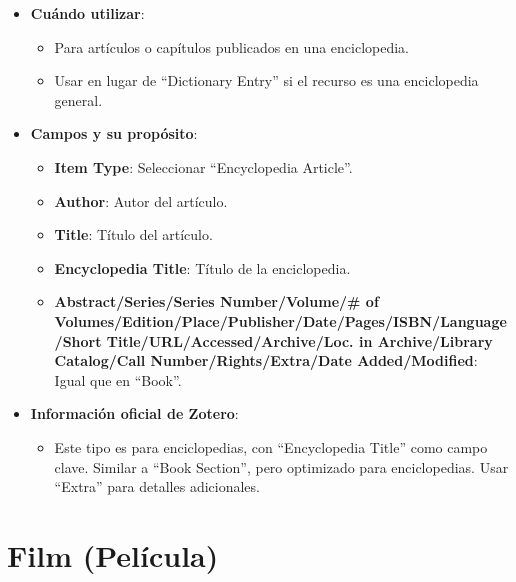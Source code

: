 \documentclass[
  jou,
  floatsintext,
  longtable,
  a4paper,
  nolmodern,
  notxfonts,
  notimes,
  12pt,
  colorlinks=true,linkcolor=blue,citecolor=blue,urlcolor=blue]{apa7}
\providecommand{\tightlist}{%
  \setlength{\itemsep}{0pt}\setlength{\parskip}{0pt}}
\begin{document}
\begin{itemize}
\tightlist
\item
  \textbf{Cuándo utilizar}:

  \begin{itemize}
  \tightlist
  \item
    Para artículos o capítulos publicados en una enciclopedia.
  \item
    Usar en lugar de ``Dictionary Entry'' si el recurso es una
    enciclopedia general.
  \end{itemize}
\item
  \textbf{Campos y su propósito}:

  \begin{itemize}
  \tightlist
  \item
    \textbf{Item Type}: Seleccionar ``Encyclopedia Article''.
  \item
    \textbf{Author}: Autor del artículo.
  \item
    \textbf{Title}: Título del artículo.
  \item
    \textbf{Encyclopedia Title}: Título de la enciclopedia.
  \item
    \textbf{Abstract/Series/Series Number/Volume/\# of
    Volumes/Edition/Place/Publisher/Date/Pages/ISBN/Language/Short
    Title/URL/Accessed/Archive/Loc. in Archive/Library Catalog/Call
    Number/Rights/Extra/Date Added/Modified}: Igual que en ``Book''.
  \end{itemize}
\item
  \textbf{Información oficial de Zotero}:

  \begin{itemize}
  \tightlist
  \item
    Este tipo es para enciclopedias, con ``Encyclopedia Title'' como
    campo clave. Similar a ``Book Section'', pero optimizado para
    enciclopedias. Usar ``Extra'' para detalles adicionales.
  \end{itemize}
\end{itemize}

\section{Film (Película)}\label{film-peluxedcula}
\end{document}
